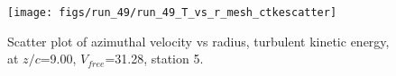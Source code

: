 \begin{figure}[H]
\centering
\texttt{[image: figs/run\_49/run\_49\_T\_vs\_r\_mesh\_ctkescatter]}
\caption{Scatter plot of azimuthal velocity vs radius, turbulent kinetic energy, at $z/c$=9.00, $V_{free}$=31.28, station 5.}
\label{fig:run_49_T_vs_r_mesh_ctkescatter}
\end{figure}


